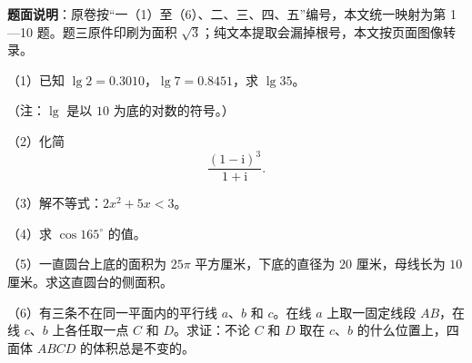 

\begin{gktip}
\textbf{题面说明}：原卷按“一（1）至（6）、二、三、四、五”编号，本文统一映射为第 1—10 题。题三原件印刷为面积 $\sqrt3$；纯文本提取会漏掉根号，本文按页面图像转录。
\end{gktip}


\begin{question}
（1）已知 $\lg2=0.3010$，$\lg7=0.8451$，求 $\lg35$。

（注：$\lg$ 是以 $10$ 为底的对数的符号。）

\end{question}
\begin{question}
（2）化简
\nopagebreak[4]
\[
\frac{(1-\mathrm i)^3}{1+\mathrm i}.
\]

\end{question}
\begin{question}
（3）解不等式：$2x^2+5x<3$。

\end{question}
\begin{question}
（4）求 $\cos165^\circ$ 的值。

\end{question}
\begin{question}
（5）一直圆台上底的面积为 $25\pi$ 平方厘米，下底的直径为 $20$ 厘米，母线长为 $10$ 厘米。求这直圆台的侧面积。

\Needspace{0.4\textheight}
\end{question}
\begin{question}
（6）有三条不在同一平面内的平行线 $a$、$b$ 和 $c$。在线 $a$ 上取一固定线段 $AB$，在线 $c$、$b$ 上各任取一点 $C$ 和 $D$。求证：不论 $C$ 和 $D$ 取在 $c$、$b$ 的什么位置上，四面体 $ABCD$ 的体积总是不变的。
\nopagebreak[4]
\begin{center}\end{center}
\nopagebreak[4]
\end{question}

